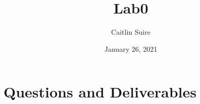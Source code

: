 \documentclass{article}
\title{Lab0}
\author{Caitlin Suire}
\date{January 26, 2021}
\begin{document}
\maketitle

\section{Questions and Deliverables}


\end{document}

